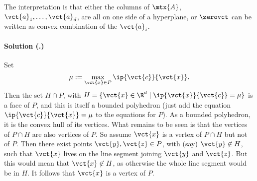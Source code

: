 \documentclass{article}
\newcounter{problemSheetNumber}
\newcounter{problems}
\renewcommand{\solution}[1]{\paragraph{Solution (\theproblemSheetNumber.\theproblems)}\addtocounter{problems}{1}\label{#1}}
\begin{document}
The interpretation is that either the columns of $\mtx{A}$, $\vct{a}_1,\dots,\vct{a}_d$, are all on one side of a hyperplane, or $\zerovct$ can be written as convex combination of the $\vct{a}_i$. 

\solution{pr2} Set
\begin{equation*}
 \mu := \max_{\vct{x}\in P} \ip{\vct{c}}{\vct{x}}.
\end{equation*}
Then the set $H\cap P$, with $H=\{\vct{x}\in \R^d\mid \ip{\vct{x}}{\vct{c}}=\mu\}$ is a face of $P$, and this is itself a bounded polyhedron (just add the equation $\ip{\vct{c}}{\vct{x}}=\mu$ to the equations for $P$). As a bounded polyhedron, it is the convex hull of its vertices. What remains to be seen is that the vertices of $P\cap H$ are also vertices of $P$. 
So assume $\vct{x}$ is a vertex of $P\cap H$ but not of $P$. Then there exist points $\vct{y},\vct{z}\in P$, with (say) $\vct{y}\not\in H$, such that $\vct{x}$ lives on the line segment joining $\vct{y}$ and $\vct{z}$. But this would mean that $\vct{x}\not\in H$, as otherwise the whole line segment would be in $H$. It follows that $\vct{x}$ is a vertex of $P$.
\end{document}
